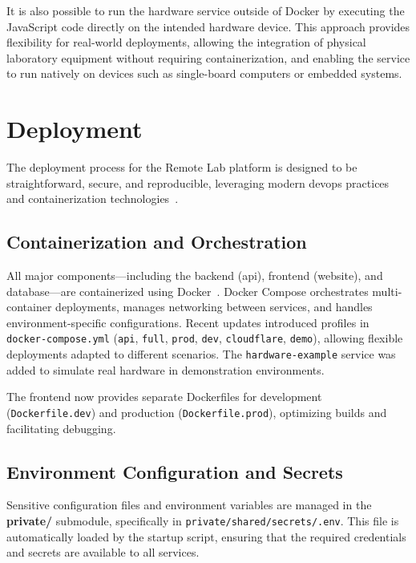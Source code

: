 It is also possible to run the hardware service outside of Docker by executing the JavaScript code directly on the intended hardware device. This approach provides flexibility for real-world deployments, allowing the integration of physical laboratory equipment without requiring containerization, and enabling the service to run natively on devices such as single-board computers or embedded systems.

\section{Deployment} \label{sec:deployment}

The deployment process for the Remote Lab platform is designed to be straightforward, secure, and reproducible, leveraging modern \ac{devops} practices and containerization technologies~\cite{docker-docs,docker-compose-docs}.

\subsection{Containerization and Orchestration} \label{subsec:containerization}

All major components—including the backend (\ac{api}), frontend (website), and database—are containerized using Docker~\cite{docker-docs}. Docker Compose orchestrates multi-container deployments, manages networking between services, and handles environment-specific configurations. Recent updates introduced profiles in \texttt{docker-compose.yml} (\texttt{api}, \texttt{full}, \texttt{prod}, \texttt{dev}, \texttt{cloudflare}, \texttt{demo}), allowing flexible deployments adapted to different scenarios. The \texttt{hardware-example} service was added to simulate real hardware in demonstration environments.

The frontend now provides separate Dockerfiles for development (\texttt{Dockerfile.dev}) and production (\texttt{Dockerfile.prod}), optimizing builds and facilitating debugging.

\subsection{Environment Configuration and Secrets} \label{subsec:env_config}

Sensitive configuration files and environment variables are managed in the \textbf{private/} submodule, specifically in \texttt{private/shared/secrets/.env}. This file is automatically loaded by the startup script, ensuring that the required credentials and secrets are available to all services.

